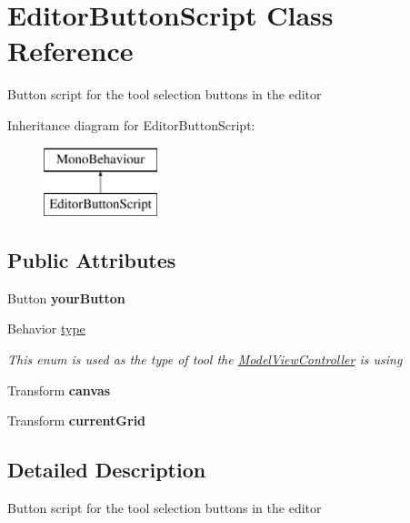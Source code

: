 \hypertarget{class_editor_button_script}{}\section{Editor\+Button\+Script Class Reference}
\label{class_editor_button_script}


Button script for the tool selection buttons in the editor  


Inheritance diagram for Editor\+Button\+Script\+:\begin{figure}[H]
\begin{center}
\leavevmode
\includegraphics[height=2.000000cm]{class_editor_button_script}
\end{center}
\end{figure}
\subsection*{Public Attributes}
\begin{DoxyCompactItemize}
\item 
\mbox{\label{class_editor_button_script_ac1393bbefbbc3b763f4dfd842005439e}} 
Button {\bfseries your\+Button}
\item 
Behavior \hyperlink{class_editor_button_script_a7df9834d8c560512d210be3c1454edd9}{type}
\begin{DoxyCompactList}\small\item\em This enum is used as the type of tool the \hyperlink{class_model_view_controller}{Model\+View\+Controller} is using \end{DoxyCompactList}\item 
\mbox{\label{class_editor_button_script_ab0b733ec12c57bf5c1a1a199ddae92c9}} 
Transform {\bfseries canvas}
\item 
\mbox{\label{class_editor_button_script_afc2d0a5f774c41306ed7cafb4b71273f}} 
Transform {\bfseries current\+Grid}
\end{DoxyCompactItemize}


\subsection{Detailed Description}
Button script for the tool selection buttons in the editor 



